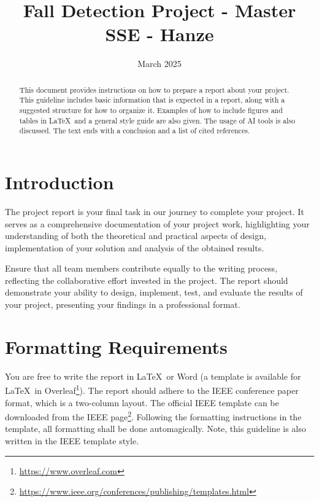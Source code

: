 \documentclass[conference]{IEEEtran}
\title{Fall Detection Project - Master SSE - Hanze}
\author{\IEEEauthorblockN{
Ali Shirazi, Amir Masoud Jafari}

\IEEEauthorblockA{
a.shirazi@st.hanze.nl, a.jafari@st.hanze.nl}}
\date{March 2025}
\begin{document}
\maketitle

\thispagestyle{plain}
\pagestyle{plain}

\begin{abstract}
This document provides instructions on how to prepare a report about your project. This guideline includes basic information that is expected in a report, along with a suggested structure for how to organize it. Examples of how to include figures and tables in \LaTeX\, and a general style guide are also given. The usage of AI tools is also discussed. The text ends with a conclusion and a list of cited references.
\end{abstract}

\section{Introduction}

\noindent The project report is your final task in our journey to complete your project. It serves as a comprehensive documentation of your project work, highlighting your understanding of both the theoretical and practical aspects of design, implementation of your solution and analysis of the obtained results. 

Ensure that all team members contribute equally to the writing process, reflecting the collaborative effort invested in the project. The report should demonstrate your ability to design, implement, test, and evaluate the results of your project, presenting your findings in a professional format.


\section{Formatting Requirements}

\noindent You are free to write the report in \LaTeX\ or Word (a template is available for \LaTeX\ in Overleaf\footnote{\url{https://www.overleaf.com}}).  The report should adhere to the IEEE conference paper format, which is a two-column layout. The official IEEE template can be downloaded from the IEEE page\footnote{\url{https://www.ieee.org/conferences/publishing/templates.html}}. Following the formatting instructions in the template, all formatting shall be done automagically. Note, this guideline is also written in the IEEE template style. 
\end{document}
